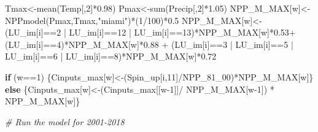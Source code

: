 \documentclass[
  10pt,
  b5paper,
]{book}
\newenvironment{Shaded}{\begin{snugshade}}{\end{snugshade}}
\newcommand{\CommentTok}[1]{\textcolor[rgb]{0.56,0.35,0.01}{\textit{#1}}}
\newcommand{\ControlFlowTok}[1]{\textcolor[rgb]{0.13,0.29,0.53}{\textbf{#1}}}
\newcommand{\DecValTok}[1]{\textcolor[rgb]{0.00,0.00,0.81}{#1}}
\newcommand{\FloatTok}[1]{\textcolor[rgb]{0.00,0.00,0.81}{#1}}
\newcommand{\FunctionTok}[1]{\textcolor[rgb]{0.00,0.00,0.00}{#1}}
\newcommand{\NormalTok}[1]{#1}
\newcommand{\OtherTok}[1]{\textcolor[rgb]{0.56,0.35,0.01}{#1}}
\newcommand{\SpecialCharTok}[1]{\textcolor[rgb]{0.00,0.00,0.00}{#1}}
\newcommand{\StringTok}[1]{\textcolor[rgb]{0.31,0.60,0.02}{#1}}
\begin{document}
\begin{Shaded}
\begin{Highlighting}[]
\NormalTok{Tmax}\OtherTok{\textless{}{-}}\FunctionTok{mean}\NormalTok{(Temp[,}\DecValTok{2}\NormalTok{]}\SpecialCharTok{*}\FloatTok{0.98}\NormalTok{)}
\NormalTok{Pmax}\OtherTok{\textless{}{-}}\FunctionTok{sum}\NormalTok{(Precip[,}\DecValTok{2}\NormalTok{]}\SpecialCharTok{*}\FloatTok{1.05}\NormalTok{)}
\NormalTok{NPP\_M\_MAX[w]}\OtherTok{\textless{}{-}}\FunctionTok{NPPmodel}\NormalTok{(Pmax,Tmax,}\StringTok{"miami"}\NormalTok{)}\SpecialCharTok{*}\NormalTok{(}\DecValTok{1}\SpecialCharTok{/}\DecValTok{100}\NormalTok{)}\SpecialCharTok{*}\FloatTok{0.5}
\NormalTok{NPP\_M\_MAX[w]}\OtherTok{\textless{}{-}}\NormalTok{(LU\_im[i]}\SpecialCharTok{==}\DecValTok{2} \SpecialCharTok{|}\NormalTok{ LU\_im[i]}\SpecialCharTok{==}\DecValTok{12} \SpecialCharTok{|}\NormalTok{ LU\_im[i]}\SpecialCharTok{==}\DecValTok{13}\NormalTok{)}\SpecialCharTok{*}\NormalTok{NPP\_M\_MAX[w]}\SpecialCharTok{*}\FloatTok{0.53}\SpecialCharTok{+}\NormalTok{ (LU\_im[i]}\SpecialCharTok{==}\DecValTok{4}\NormalTok{)}\SpecialCharTok{*}\NormalTok{NPP\_M\_MAX[w]}\SpecialCharTok{*}\FloatTok{0.88} \SpecialCharTok{+}\NormalTok{ (LU\_im[i]}\SpecialCharTok{==}\DecValTok{3} \SpecialCharTok{|}\NormalTok{ LU\_im[i]}\SpecialCharTok{==}\DecValTok{5} \SpecialCharTok{|}\NormalTok{ LU\_im[i]}\SpecialCharTok{==}\DecValTok{6} \SpecialCharTok{|}\NormalTok{ LU\_im[i]}\SpecialCharTok{==}\DecValTok{8}\NormalTok{)}\SpecialCharTok{*}\NormalTok{NPP\_M\_MAX[w]}\SpecialCharTok{*}\FloatTok{0.72}

\ControlFlowTok{if}\NormalTok{ (w}\SpecialCharTok{==}\DecValTok{1}\NormalTok{) \{Cinputs\_max[w]}\OtherTok{\textless{}{-}}\NormalTok{(Spin\_up[i,}\DecValTok{11}\NormalTok{]}\SpecialCharTok{/}\NormalTok{NPP\_81\_00)}\SpecialCharTok{*}\NormalTok{NPP\_M\_MAX[w]\} }\ControlFlowTok{else}\NormalTok{ \{Cinputs\_max[w]}\OtherTok{\textless{}{-}}\NormalTok{(Cinputs\_max[[w}\DecValTok{{-}1}\NormalTok{]]}\SpecialCharTok{/}\NormalTok{ NPP\_M\_MAX[w}\DecValTok{{-}1}\NormalTok{]) }\SpecialCharTok{*}\NormalTok{ NPP\_M\_MAX[w]\} }

\CommentTok{\# Run the model for 2001{-}2018 }


\end{Highlighting}
\end{Shaded}
\end{document}

